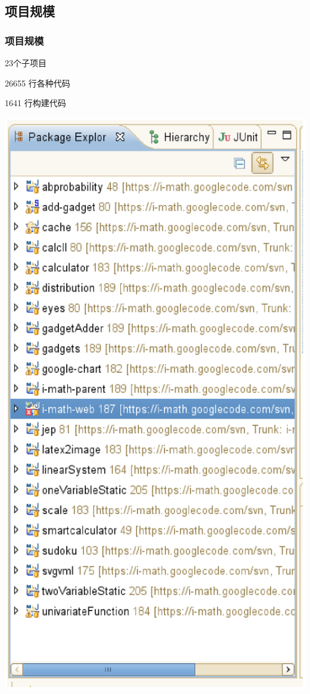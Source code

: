 \documentclass[dvipdfm,serif,mathserif]{beamer}
\begin{document}
\subsection{项目规模}

\begin{frame}
  \frametitle{项目规模}
\begin{itemize}
\begin{minipage}[c]{0.6\textwidth}
\item 23个子项目
\item 26655 行各种代码
\item 1641 行构建代码
  \end{minipage}
  \begin{minipage}[c]{0.3\textwidth}
  \includegraphics[width=\textwidth]{eclipse.ps}
  \end{minipage}
\end{itemize}
\end{frame}
\end{document}
